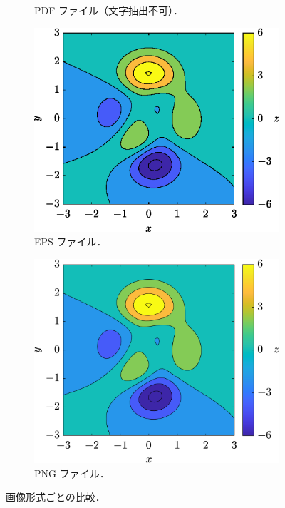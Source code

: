 \begin{figure}[tp]
\begin{subfigure}{0.45\columnwidth}
        \caption{PDF ファイル（文字抽出不可）．}
        \label{subfig:figcomp_pdf2}
    \end{subfigure}

    \vspace{5mm} %
    \begin{subfigure}{0.45\columnwidth}
        \centering
        \includegraphics[width=\columnwidth]{figure/test3.eps}
        \caption{EPS ファイル．}
        \label{subfig:figcomp_eps}
    \end{subfigure}
    \hfill %
    \begin{subfigure}{0.45\columnwidth}
        \centering
        \includegraphics[width=\columnwidth]{figure/test4.png}
        \caption{PNG ファイル．}
        \label{subfig:figcomp_png}
    \end{subfigure}
    \caption{画像形式ごとの比較．}
    \label{fig:figure_comparison1}
\end{figure}

